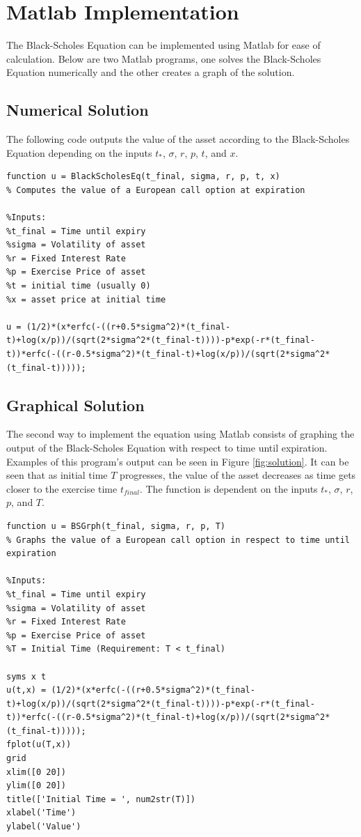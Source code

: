\documentclass{article}
\begin{document}
\section{Matlab Implementation}
The Black-Scholes Equation can be implemented using Matlab for ease of calculation. Below are two Matlab programs, one solves the Black-Scholes Equation numerically and the other creates a graph of the solution.
\subsection{Numerical Solution}
The following code outputs the value of the asset according to the Black-Scholes Equation depending on the inputs $t_*$, $\sigma$, $r$, $p$, $t$, and $x$.
\begin{verbatim}
function u = BlackScholesEq(t_final, sigma, r, p, t, x)
% Computes the value of a European call option at expiration

%Inputs:
%t_final = Time until expiry
%sigma = Volatility of asset
%r = Fixed Interest Rate
%p = Exercise Price of asset
%t = initial time (usually 0)
%x = asset price at initial time

u = (1/2)*(x*erfc(-((r+0.5*sigma^2)*(t_final-t)+log(x/p))/(sqrt(2*sigma^2*(t_final-t))))-p*exp(-r*(t_final-t))*erfc(-((r-0.5*sigma^2)*(t_final-t)+log(x/p))/(sqrt(2*sigma^2*(t_final-t)))));
\end{verbatim}
\subsection{Graphical Solution}
The second way to implement the equation using Matlab consists of graphing the output of the Black-Scholes Equation with respect to time until expiration. Examples of this program's output can be seen in Figure \ref{fig:solution}. It can be seen that as initial time $T$ progresses, the value of the asset decreases as time gets closer to the exercise time $t_{final}$. The function is dependent on the inputs $t_*$, $\sigma$, $r$, $p$, and $T$.
\begin{verbatim}
function u = BSGrph(t_final, sigma, r, p, T)
% Graphs the value of a European call option in respect to time until expiration

%Inputs:
%t_final = Time until expiry
%sigma = Volatility of asset
%r = Fixed Interest Rate
%p = Exercise Price of asset
%T = Initial Time (Requirement: T < t_final)

syms x t
u(t,x) = (1/2)*(x*erfc(-((r+0.5*sigma^2)*(t_final-t)+log(x/p))/(sqrt(2*sigma^2*(t_final-t))))-p*exp(-r*(t_final-t))*erfc(-((r-0.5*sigma^2)*(t_final-t)+log(x/p))/(sqrt(2*sigma^2*(t_final-t)))));
fplot(u(T,x))
grid
xlim([0 20])
ylim([0 20])
title(['Initial Time = ', num2str(T)])
xlabel('Time')
ylabel('Value')
\end{verbatim}
\end{document}
